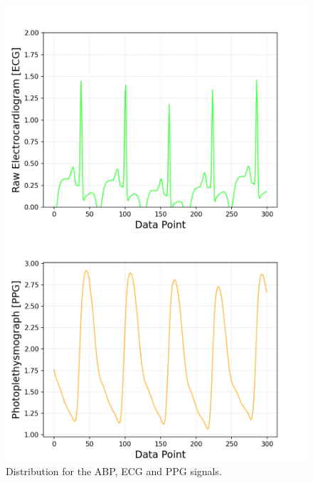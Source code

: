 \documentclass{article}
\begin{document}
\begin{figure}[h!]
\begin{minipage}[b]{0.32\textwidth}
	\end{minipage}
	\begin{minipage}[b]{0.32\textwidth}
		\includegraphics[width=\textwidth]{plots/series_ECG_zoom.png}
		
	\end{minipage}
	\begin{minipage}[b]{0.32\textwidth}
		\includegraphics[width=\textwidth]{plots/series_PPG_zoom.png}	
	\end{minipage}
	
	
	\caption{Distribution for the ABP, ECG and PPG signals.}
	\label{signals}
\end{figure}
\end{document}
